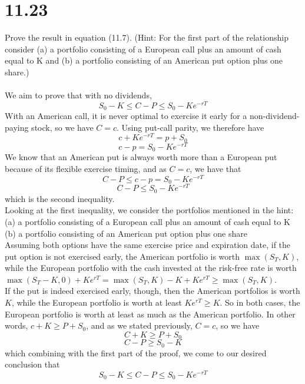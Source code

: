 \documentclass{article}
\begin{document}
{\Large 

\section*{11.23}
Prove the result in equation (11.7). (Hint: For the first part of the relationship consider (a) a portfolio consisting of a European call plus an amount of cash equal to K and (b) a portfolio consisting of an American put option plus one share.) \\ \\
We aim to prove that with no dividends, 
\[
  S_0 - K \leq C - P \leq S_0 - Ke^{-rT}
\]
With an American call, it is never optimal to exercise it early for a non-dividend-paying stock, so we have \(C = c\). Using put-call parity, we therefore have 
\[
  c + Ke^{-rT} = p + S_0
\]
\[
  c - p = S_0 - Ke^{-rT}
\]
We know that an American put is always worth more than a European put because of its flexible exercise timing, and as \(C = c\), we have that 
\[
  C - P \leq c - p = S_0 - Ke^{-rT}
\]
\[
  C - P \leq S_0 - Ke^{-rT}
\]
which is the second inequality. \\
Looking at the first inequality, we consider the portfolios mentioned in the hint: \\
(a) a portfolio consisting of a European call plus an amount of cash equal to K \\
(b) a portfolio consisting of an American put option plus one share \\
Assuming both options have the same exercise price and expiration date, if the put option is not exercised early, the American portfolio is worth \(\max(S_T, K)\), while the European portfolio with the cash invested at the risk-free rate is worth \(\max(S_T - K, 0) + Ke^{rT} = \max(S_T, K) - K + Ke^{rT} \geq \max(S_T, K)\). \\
If the put is indeed exercised early, though, then the American portfolios is worth \(K\), while the European portfolio is worth at least $Ke^{rT} \geq K$. So in both cases, the European portfolio is worth at least as much as the American portfolio. In other words, \(c + K \geq P + S_0\), and as we stated previously, \(C = c\), so we have 
\[ 
  C + K \geq P + S_0
\]
\[ 
  C - P \geq S_0 - K
\]
which combining with the first part of the proof, we come to our desired conclusion that
\[
  S_0 - K \leq C - P \leq S_0 - Ke^{-rT}
\]

}
\end{document}
